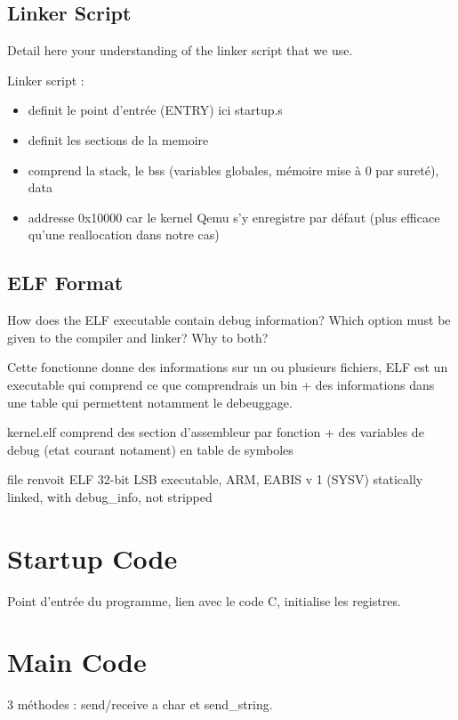 \documentclass[10]{article}
\begin{document}
\subsection{Linker Script}

Detail here your understanding of the linker script that we use.

Linker script :

\begin{itemize}
  \item definit le point d'entrée (ENTRY) ici startup.s
  \item definit les sections de la memoire
  \item comprend la stack, le bss (variables globales, mémoire mise à 0 par sureté), data
  \item addresse 0x10000 car le kernel Qemu s'y enregistre par défaut (plus efficace qu'une reallocation dans notre cas)
\end{itemize}

\subsection{ELF Format}

How does the ELF executable contain debug information? Which option must
be given to the compiler and linker? Why to both?

Cette fonctionne donne des informations sur un ou plusieurs fichiers, ELF est un executable qui comprend ce que comprendrais un bin + des informations dans une table qui permettent notamment le debeuggage. 

kernel.elf comprend des section d'assembleur par fonction + des variables de debug (etat courant notament) en table de symboles 

file renvoit
ELF 32-bit LSB executable, ARM, EABIS v 1 (SYSV) statically linked, with debug_info, not stripped

\section{Startup Code}

Point d'entrée du programme, lien avec le code C, initialise les registres.

\section{Main Code}

3 méthodes : send/receive a char et send_string.
\end{document}
